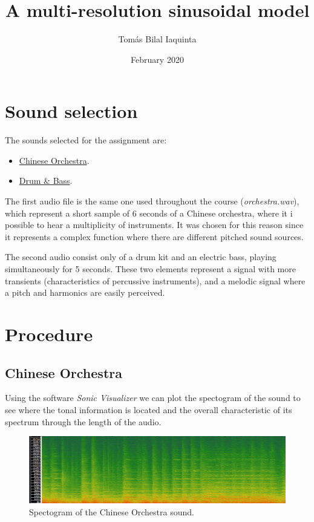 \documentclass[11pt]{article}
\begin{document}
\title{\vspace{-5cm}A multi-resolution sinusoidal model}
\date{February 2020}
\author{Tomás Bilal Iaquinta}

\maketitle
\hrulefill
{}

\section{Sound selection}

The sounds selected for the assignment are:

\begin{itemize}
	\item \href{https://freesound.org/people/xserra/sounds/217543/}{Chinese Orchestra}.
	\item \href{https://freesound.org/people/Ionicsmusic/sounds/193772/}{Drum \& Bass}.
\end{itemize}

The first audio file is the same one used throughout the course (\textit{orchestra.wav}), which represent a short sample of 6 seconds of a Chinese orchestra, where it i possible to hear a multiplicity of instruments. It was chosen for this reason since it represents a complex function where there are different pitched sound sources. \vspace{8pt}

The second audio consist only of a drum kit and an electric bass, playing simultaneously for 5 seconds. These two elements represent a signal with more transients (characteristics of percussive instruments), and a melodic signal where a pitch and harmonics are easily perceived.

\section{Procedure}
\subsection{Chinese Orchestra}

Using the software \textit{Sonic Visualizer} we can plot the spectogram of the sound to see where the tonal information is located and the overall characteristic of its spectrum through the length of the audio. 

\begin{figure}[h]
  \includegraphics[width=\linewidth]{orch.png}
  \caption{Spectogram of the Chinese Orchestra sound.}
  \label{fig:orch}
\end{figure}
\end{document}
